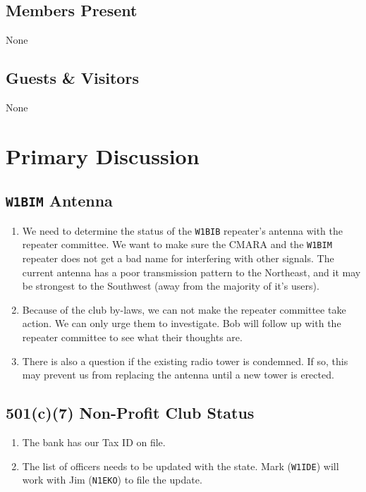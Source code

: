 \documentclass[10pt,letterpaper]{article}
\begin{document}
\subsection{Members Present}

None

\subsection{Guests \& Visitors}

None

\section{Primary Discussion}

\subsection{\texttt{W1BIM} Antenna}
\begin{enumerate}
\item We need to determine the status of the \texttt{W1BIB} repeater's antenna with the repeater committee. We want to make sure the CMARA and the \texttt{W1BIM} repeater does not get a bad name for interfering with other signals. The current antenna has a poor transmission pattern to the Northeast, and it may be strongest to the Southwest (away from the majority of it's users).

\item Because of the club by-laws, we can not make the repeater committee take action. We can only urge them to investigate. Bob will follow up with the repeater committee to see what their thoughts are.

\item There is also a question if the existing radio tower is condemned. If so, this may prevent us from replacing the antenna until a new tower is erected.
\end{enumerate}
\subsection{501(c)(7) Non-Profit Club Status}
\begin{enumerate}
\item The bank has our Tax ID on file.
\item The list of officers needs to be updated with the state. Mark (\texttt{W1IDE}) will work with Jim (\texttt{N1EKO}) to file the update.
\end{enumerate}
\end{document}
